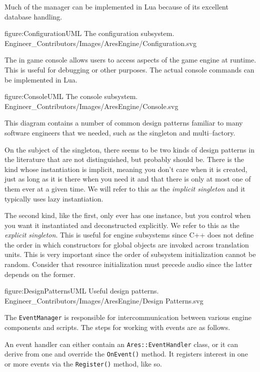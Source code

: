 Much of the manager can be implemented in Lua because of its excellent database handling.

\FullPageDiagram
    {figure:ConfigurationUML}
    {The configuration subsystem.}
    {Engineer_Contributors/Images/AresEngine/Configuration.svg}

\page
{}
The in game console allows users to access aspects of the game engine at runtime. This is useful for debugging or other purposes. The actual console commands can be implemented in Lua.

\FullPageDiagram
    {figure:ConsoleUML}
    {The console subsystem.}
    {Engineer_Contributors/Images/AresEngine/Console.svg}

\page
{}
This diagram contains a number of common design patterns familiar to many software engineers that we needed, such as the singleton and multi--factory.

On the subject of the singleton, there seems to be two kinds of design patterns in the literature that are not distinguished, but probably should be. There is the kind whose instantiation is implicit, meaning you don't care when it is created, just as long as it is there when you need it and that there is only at most one of them ever at a given time. We will refer to this as the {\it implicit singleton} and it typically uses lazy instantiation.

The second kind, like the first, only ever has one instance, but you control when you want it instantiated and deconstructed explicitly. We refer to this as the {\it explicit singleton}. This is useful for engine subsystems since C++ does not define the order in which constructors for global objects are invoked across translation units. This is very important since the order of subsystem initialization cannot be random. Consider that resource initialization must precede audio since the latter depends on the former.

\FullPageDiagram
    {figure:DesignPatternsUML}
    {Useful design patterns.}
    {Engineer_Contributors/Images/AresEngine/Design Patterns.svg}

\page 
{}
The {\tt EventManager} is responsible for intercommunication between various engine components and scripts. The steps for working with events are as follows.

An event handler can either contain an {\tt Ares::EventHandler} class, or it can derive from one and override the {\tt OnEvent()} method. It registers interest in one or more events via the {\tt Register()} method, like so.

